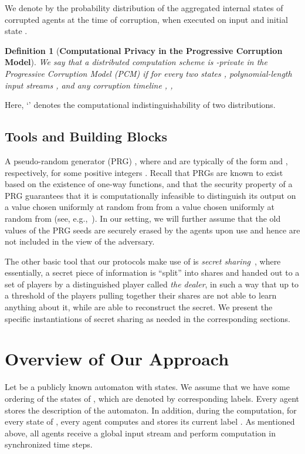 \documentclass[letterpaper,11pt]{article}
\newcommand{\A}{}
\newtheorem{definition}{Definition}
\begin{document}
We denote by  the probability
distribution of the aggregated internal states of corrupted agents at
the time of corruption, when executed on input  and
initial state .




\begin{definition} [\bf Computational Privacy in the Progressive Corruption Model]
\label{defProgressive}
We say that a distributed computation scheme  is {\rm
-private in the Progressive Corruption Model (PCM)} if for every
two states , polynomial-length input streams , and any corruption timeline , ,

\end{definition}
\noindent Here, `' denotes the computational indistinguishability
of two distributions.






\subsection{Tools and Building Blocks}
\label{sec:tools-app}
A pseudo-random generator (PRG) , where  and  are typically of the
form  and , respectively, for some positive
integers . Recall that PRGs are known to exist based on the
existence of one-way functions, and that the security property of a
PRG guarantees that it is computationally infeasible to distinguish
its output on a value chosen uniformly at random from  from a value
chosen uniformly at random from  (see,
e.g.,~\cite{Goldreich2000}). In our setting, we will further assume that
the old values
of the PRG seeds are securely erased by the agents upon use and hence are
not included in the view of the adversary.

The other basic tool that our protocols make use of 
is
{\em secret sharing}~\cite{Sha79}, where
essentially, a secret piece of information is ``split'' into shares
and handed out to a set of players by a distinguished player called
{\em the dealer}, in such a way that up to a threshold  of the
players pulling together their shares are not able to learn anything
about it, while  are able to reconstruct the secret. We
present the specific instantiations of secret sharing as needed
in the 
corresponding sections.
 
\section{Overview of Our Approach}
\label{outline}
Let  be a publicly known automaton with  states. We assume
that we have some ordering of the states of \A, which are denoted
by corresponding labels.  Every agent
stores the description of the automaton. In addition, during the
computation, for every state  of \A, every agent  computes
and stores its current label . 
As mentioned above, all agents receive a global input stream
 and perform computation in
synchronized time steps.
\end{document}
